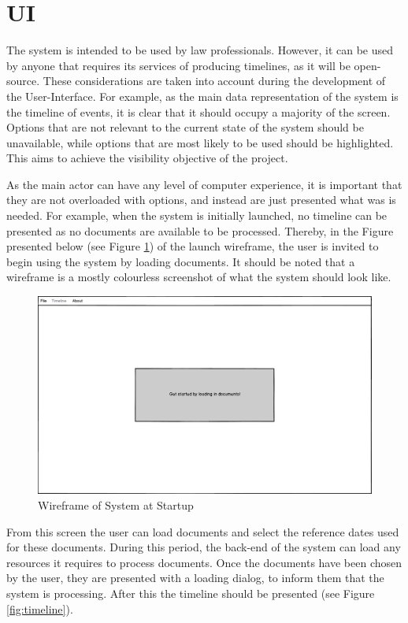 \section{UI}
\par The system is intended to be used by law professionals. However, it can be used by anyone that requires its services of producing timelines, as it will be open-source.  These considerations are taken into account during the development of the User-Interface. For example, as the main data representation of the system is the timeline of events, it is clear that it should occupy a majority of the screen. Options that are not relevant to the current state of the system should be unavailable, while options that are most likely to be used should be highlighted. This aims to achieve the visibility objective of the project.
\par As the main actor can have any level of computer experience, it is important that they are not overloaded with options, and instead are just presented what was is needed. For example, when the system is initially launched, no timeline can be presented as no documents are available to be processed. Thereby, in the Figure presented below (see Figure \ref{fig:startup}) of the launch wireframe, the user is invited to begin using the system by loading documents. It should be noted that a wireframe is a mostly colourless screenshot of what the system should look like.
\begin{figure}[h]
\caption{Wireframe of System at Startup}
\label{fig:startup}
\includegraphics[width=\linewidth]{startup.png}
\centering
\end{figure}
\par From this screen the user can load documents and select the reference dates used for these documents. During this period, the back-end of the system can load any resources it requires to process documents. Once the documents have been chosen by the user, they are presented with a loading dialog, to inform them that the system is processing. After this the timeline should be presented (see Figure \ref{fig:timeline}).
